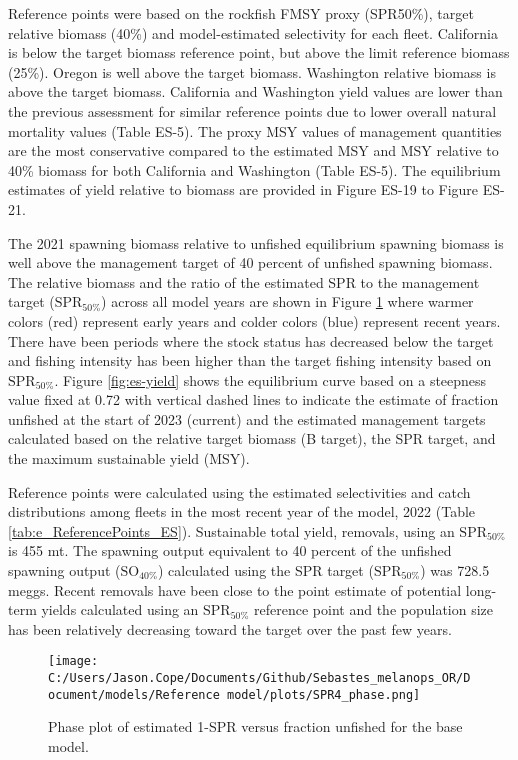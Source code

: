 \documentclass[11pt,
  english,
  letterpaper,
]{article}
\begin{document}
Reference points were based on the rockfish FMSY proxy (SPR50\%), target relative biomass (40\%) and model-estimated selectivity for each fleet. California is below the target biomass reference point, but above the limit reference biomass (25\%). Oregon is well above the target biomass. Washington relative biomass is above the target biomass. California and Washington yield values are lower than the previous assessment for similar reference points due to lower overall natural mortality values (Table ES-5). The proxy MSY values of management quantities are the most conservative compared to the estimated MSY and MSY relative to 40\% biomass for both California and Washington (Table ES-5). The equilibrium estimates of yield relative to biomass are provided in Figure ES-19 to Figure ES-21.

The 2021 spawning biomass relative to unfished equilibrium spawning biomass is well above the management target of 40 percent of unfished spawning biomass. The relative biomass and the ratio of the estimated SPR to the management target (\(\text{SPR}_{50\%}\)) across all model years are shown in Figure \ref{fig:es-phase} where warmer colors (red) represent early years and colder colors (blue) represent recent years. There have been periods where the stock status has decreased below the target and fishing intensity has been higher than the target fishing intensity based on \(\text{SPR}_{50\%}\). Figure \ref{fig:es-yield} shows the equilibrium curve based on a steepness value fixed at 0.72 with vertical dashed lines to indicate the estimate of fraction unfished at the start of 2023 (current) and the estimated management targets calculated based on the relative target biomass (B target), the SPR target, and the maximum sustainable yield (MSY).

Reference points were calculated using the estimated selectivities and catch distributions among fleets in the most recent year of the model, 2022 (Table \ref{tab:e_ReferencePoints_ES}). Sustainable total yield, removals, using an \(\text{SPR}_{50\%}\) is 455 mt. The spawning output equivalent to 40 percent of the unfished spawning output (\(\text{SO}_{40\%}\)) calculated using the SPR target (\(\text{SPR}_{50\%}\)) was 728.5 meggs. Recent removals have been close to the point estimate of potential long-term yields calculated using an \(\text{SPR}_{50\%}\) reference point and the population size has been relatively decreasing toward the target over the past few years.

\begin{figure}
\centering
\texttt{[image: C:/Users/Jason.Cope/Documents/Github/Sebastes\_melanops\_OR/Document/models/Reference model/plots/SPR4\_phase.png]}
\caption{Phase plot of estimated 1-SPR versus fraction unfished for the base model.\label{fig:es-phase}}
\end{figure}
\end{document}
